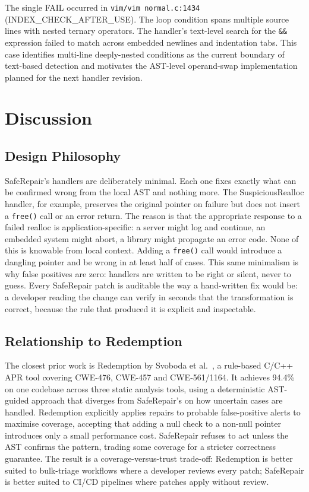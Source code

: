 \documentclass[conference]{IEEEtran}
\begin{document}
The single FAIL occurred in \texttt{vim/vim normal.c:1434}
(INDEX\_CHECK\_AFTER\_USE). The loop condition spans multiple source lines with
nested ternary operators. The handler's text-level search for the \texttt{\&\&}
expression failed to match across embedded newlines and indentation tabs. This case
identifies multi-line deeply-nested conditions as the current boundary of text-based
detection and motivates the AST-level operand-swap implementation planned for the
next handler revision.


\section{Discussion}

\subsection{Design Philosophy}
SafeRepair's handlers are deliberately minimal. Each one fixes exactly what can be
confirmed wrong from the local AST and nothing more. The SuspiciousRealloc handler,
for example, preserves the original pointer on failure but does not insert a
\texttt{free()} call or an error return. The reason is that the appropriate response
to a failed realloc is application-specific: a server might log and continue, an
embedded system might abort, a library might propagate an error code. None of this
is knowable from local context. Adding a \texttt{free()} call would introduce a
dangling pointer and be wrong in at least half of cases. This same minimalism is why false positives are zero: handlers are written to be
right or silent, never to guess. Every SafeRepair patch is auditable the way a hand-written fix would be: a developer
reading the change can verify in seconds that the transformation is correct, because
the rule that produced it is explicit and inspectable.

\subsection{Relationship to Redemption}
The closest prior work is Redemption by Svoboda et al.~\cite{b2}, a rule-based
C/C++ APR tool covering CWE-476, CWE-457 and CWE-561/1164. It achieves 94.4\% on one codebase across three static analysis tools, using
a deterministic AST-guided approach that diverges from SafeRepair's on how
uncertain cases are handled.
Redemption explicitly applies repairs to probable false-positive alerts to maximise
coverage, accepting that adding a null check to a non-null pointer introduces only
a small performance cost. SafeRepair refuses to act unless the AST confirms the pattern, trading some
coverage for a stricter correctness guarantee.
The result is a coverage-versus-trust trade-off: Redemption is better suited to
bulk-triage workflows where a developer reviews every patch; SafeRepair is better
suited to CI/CD pipelines where patches apply without review.
\end{document}

